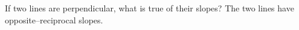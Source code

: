 {If two lines are perpendicular, what is true of their slopes?}
{The two lines have opposite--reciprocal slopes.}

